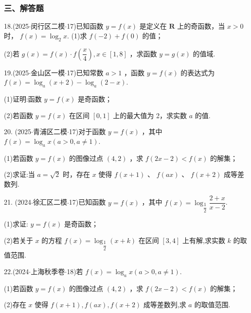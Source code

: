\subsubsection*{三、解答题}

18.(2025$\cdot$闵行区二模$\cdot$17)已知函数 $y = f\left( x\right)$ 是定义在 $\mathbf{R}$ 上的奇函数，当 $x > 0$ 时， $f\left( x\right)  = {\log }_{2}x$. (1)求 $f\left( {-2}\right)  + f\left( 0\right)$ 的值；

(2)若 $g\left( x\right)  = f\left( x\right)  \cdot  f\left( \dfrac{x}{4}\right) ,x \in  \left\lbrack  {1,8}\right\rbrack$ ，求函数 $y = g\left( x\right)$ 的值域.

19.(2025$\cdot$金山区一模$\cdot$17)已知常数 $a > 1$ ，函数 $y = f\left( x\right)$ 的表达式为 $f\left( x\right)  = {\log }_{a}\left( {x + 2}\right)  - {\log }_{a}\left( {2 - x}\right)$.

(1)证明:函数 $y = f\left( x\right)$ 是奇函数；

(2)若函数 $y = f\left( x\right)$ 在区间 $\left\lbrack  {0,1}\right\rbrack$ 上的最大值为 2，求实数 $a$ 的值.

20. (2025$\cdot$青浦区二模$\cdot$17)对于函数 $y = f\left( x\right)$ ，其中 $f\left( x\right)  = {\log }_{a}x\left( {a > 0,a \neq  1}\right)$.

(1)若函数 $y = f\left( x\right)$ 的图像过点 $\left( {4,2}\right)$ ，求 $f\left( {{2x} - 2}\right)  < f\left( x\right)$ 的解集；

(2)求证:当 $a = \sqrt{2}$ 时，存在 $x$ 使得 $f\left( {x + 1}\right)$ 、 $f\left( {ax}\right)$ 、 $f\left( {x + 2}\right)$ 成等差数列.

21. (2024$\cdot$徐汇区二模$\cdot$17)已知函数 $y = f\left( x\right)$ ，其中 $f\left( x\right)  = {\log }_{\dfrac{1}{2}}\dfrac{2 + x}{x - 2}$.

(1)求证: $y = f\left( x\right)$ 是奇函数；

(2)若关于 $x$ 的方程 $f\left( x\right)  = {\log }_{\dfrac{1}{2}}\left( {x + k}\right)$ 在区间 $\left\lbrack  {3,4}\right\rbrack$ 上有解,求实数 $k$ 的取值范围.

22.(2024$\cdot$上海秋季卷$\cdot$18)若 $f\left( x\right)  = {\log }_{a}x\left( {a > 0,a \neq  1}\right)$.

(1)若函数 $y = f\left( x\right)$ 的图像过点 $\left( {4,2}\right)$ ，求 $f\left( {{2x} - 2}\right)  < f\left( x\right)$ 的解集；

(2)存在 $x$ 使得 $f\left( {x + 1}\right) ,f\left( {ax}\right) ,f\left( {x + 2}\right)$ 成等差数列,求 $a$ 的取值范围.

